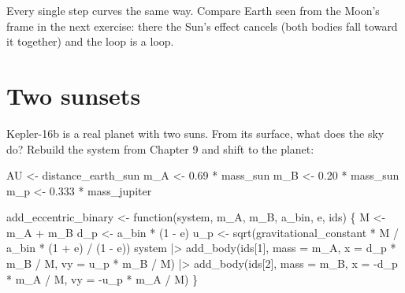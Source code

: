 \documentclass[
  10.5pt,
  letterpaper,
]{scrbook}
\newenvironment{Shaded}{\begin{snugshade}}{\end{snugshade}}
\newcommand{\AttributeTok}[1]{\textcolor[rgb]{0.00,0.00,0.00}{#1}}
\newcommand{\ControlFlowTok}[1]{\textcolor[rgb]{0.00,0.00,0.00}{#1}}
\newcommand{\DecValTok}[1]{\textcolor[rgb]{0.00,0.00,0.00}{#1}}
\newcommand{\FloatTok}[1]{\textcolor[rgb]{0.00,0.00,0.00}{#1}}
\newcommand{\FunctionTok}[1]{\textcolor[rgb]{0.00,0.00,0.00}{#1}}
\newcommand{\NormalTok}[1]{\textcolor[rgb]{0.00,0.00,0.00}{#1}}
\newcommand{\OtherTok}[1]{\textcolor[rgb]{0.00,0.00,0.00}{#1}}
\newcommand{\SpecialCharTok}[1]{\textcolor[rgb]{0.00,0.00,0.00}{#1}}
\theoremstyle{plain}
\theoremstyle{remark}
\begin{document}
Every single step curves the same way. Compare Earth seen from the
Moon's frame in the next exercise: there the Sun's effect cancels (both
bodies fall toward it together) and the loop is a loop.

\section{Two sunsets}\label{two-sunsets}

Kepler-16b is a real planet with two suns. From its surface, what does
the sky do? Rebuild the system from Chapter 9 and shift to the planet:

\begin{Shaded}
\begin{Highlighting}[]
\NormalTok{AU  }\OtherTok{\textless{}{-}}\NormalTok{ distance\_earth\_sun}
\NormalTok{m\_A }\OtherTok{\textless{}{-}} \FloatTok{0.69} \SpecialCharTok{*}\NormalTok{ mass\_sun}
\NormalTok{m\_B }\OtherTok{\textless{}{-}} \FloatTok{0.20} \SpecialCharTok{*}\NormalTok{ mass\_sun}
\NormalTok{m\_p }\OtherTok{\textless{}{-}} \FloatTok{0.333} \SpecialCharTok{*}\NormalTok{ mass\_jupiter}

\NormalTok{add\_eccentric\_binary }\OtherTok{\textless{}{-}} \ControlFlowTok{function}\NormalTok{(system, m\_A, m\_B, a\_bin, e, ids) \{}
\NormalTok{  M   }\OtherTok{\textless{}{-}}\NormalTok{ m\_A }\SpecialCharTok{+}\NormalTok{ m\_B}
\NormalTok{  d\_p }\OtherTok{\textless{}{-}}\NormalTok{ a\_bin }\SpecialCharTok{*}\NormalTok{ (}\DecValTok{1} \SpecialCharTok{{-}}\NormalTok{ e)}
\NormalTok{  u\_p }\OtherTok{\textless{}{-}} \FunctionTok{sqrt}\NormalTok{(gravitational\_constant }\SpecialCharTok{*}\NormalTok{ M }\SpecialCharTok{/}\NormalTok{ a\_bin }\SpecialCharTok{*}\NormalTok{ (}\DecValTok{1} \SpecialCharTok{+}\NormalTok{ e) }\SpecialCharTok{/}\NormalTok{ (}\DecValTok{1} \SpecialCharTok{{-}}\NormalTok{ e))}
\NormalTok{  system }\SpecialCharTok{|\textgreater{}}
    \FunctionTok{add\_body}\NormalTok{(ids[}\DecValTok{1}\NormalTok{], }\AttributeTok{mass =}\NormalTok{ m\_A, }\AttributeTok{x =}\NormalTok{  d\_p }\SpecialCharTok{*}\NormalTok{ m\_B }\SpecialCharTok{/}\NormalTok{ M, }\AttributeTok{vy =}\NormalTok{  u\_p }\SpecialCharTok{*}\NormalTok{ m\_B }\SpecialCharTok{/}\NormalTok{ M) }\SpecialCharTok{|\textgreater{}}
    \FunctionTok{add\_body}\NormalTok{(ids[}\DecValTok{2}\NormalTok{], }\AttributeTok{mass =}\NormalTok{ m\_B, }\AttributeTok{x =} \SpecialCharTok{{-}}\NormalTok{d\_p }\SpecialCharTok{*}\NormalTok{ m\_A }\SpecialCharTok{/}\NormalTok{ M, }\AttributeTok{vy =} \SpecialCharTok{{-}}\NormalTok{u\_p }\SpecialCharTok{*}\NormalTok{ m\_A }\SpecialCharTok{/}\NormalTok{ M)}
\NormalTok{\}}


\end{Highlighting}
\end{Shaded}
\end{document}
